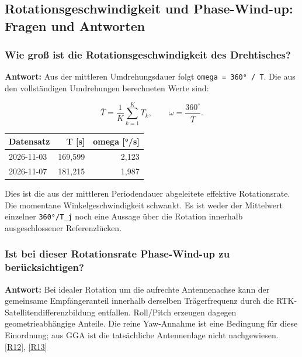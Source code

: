 \documentclass[11pt,a4paper]{article}
\numberwithin{equation}{section}
\numberwithin{figure}{section}
\begin{document}
\subsection{Rotationsgeschwindigkeit und Phase-Wind-up: Fragen und Antworten}

\subsubsection{Wie groß ist die Rotationsgeschwindigkeit des Drehtisches?}

\textbf{Antwort:} Aus der mittleren Umdrehungsdauer folgt {\small\texttt{omega = 360° /\allowbreak{} T}}. Die aus den vollständigen Umdrehungen berechneten Werte sind:

\begin{equation}\overline T=\frac{1}{K}\sum_{k=1}^{K}T_k,\qquad \omega=\frac{360^{\circ}}{\overline T}.\label{eq:de-rotation}\end{equation}

\begin{center}\begin{lrbox}{\reporttable}\small\setlength{\tabcolsep}{4pt}\begin{tabular}{lrr}\toprule
Datensatz & T [s] & omega [°/\allowbreak{}s]\\\midrule
2026-11-03 & 169,599 & 2,123\\
2026-11-07 & 181,215 & 1,987\\
\bottomrule\end{tabular}\end{lrbox}\ifdim\wd\reporttable>\linewidth\resizebox{\linewidth}{!}{\usebox{\reporttable}}\else\usebox{\reporttable}\fi\end{center}

Dies ist die aus der mittleren Periodendauer abgeleitete effektive Rotationsrate. Die momentane Winkelgeschwindigkeit schwankt. Es ist weder der Mittelwert einzelner {\small\texttt{360°/\allowbreak{}T\_\allowbreak{}j}} noch eine Aussage über die Rotation innerhalb ausgeschlossener Referenzlücken.

\subsubsection{Ist bei dieser Rotationsrate Phase-Wind-up zu berücksichtigen?}

\textbf{Antwort:} Bei idealer Rotation um die aufrechte Antennenachse kann der gemeinsame Empfängeranteil innerhalb derselben Trägerfrequenz durch die RTK-Satellitendifferenzbildung entfallen. Roll/\allowbreak{}Pitch erzeugen dagegen geometrieabhängige Anteile. Die reine Yaw-Annahme ist eine Bedingung für diese Einordnung; aus GGA ist die tatsächliche Antennenlage nicht nachgewiesen. \hyperlink{ref-R12}{[R12]}, \hyperlink{ref-R13}{[R13]}
\end{document}
